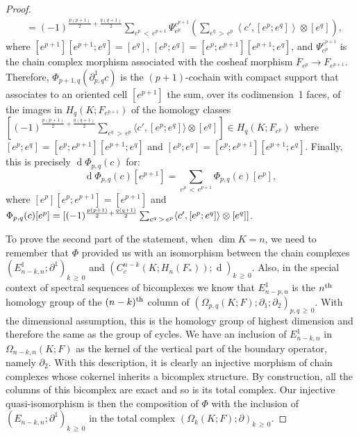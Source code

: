 \documentclass[AHL,Unicode,longabstracts,published]{cedram}
\DeclareMathOperator{\df}{d}
\begin{document}
\begin{proof}
\begin{equation*}
\begin{split}
& = (-1)^{\frac{p(p+1)}{2}+\frac{q(q+1)}{2}}\sum_{e^p\,<\,e^{p+1}} \Psi_{e^p}^{e^{p+1}} \left(\sum_{e^q\,>\,e^{p}} \left\langle c',[e^{p};e^q]\right\rangle \otimes[e^q]\right),
\end{split}
\end{equation*}
where $[e^{p+1}][e^{p+1};e^q]=[e^q]$, $[e^{p};e^q]=[e^p;e^{p+1}][e^{p+1};e^q]$, and $\Psi_{e^p}^{e^{p+1}}$ is the chain complex morphism associated with the cosheaf morphism $F_{e^p}\rightarrow F_{e^{p+1}}$. Therefore, $\Phi_{p+1,q}(\partial^1_{p,q} c)$ is the $(p+1)$-cochain with compact support that associates to an oriented cell $[e^{p+1}]$ the sum, over its codimension~1 faces, of the images in $H_q(K;F_{e^{p+1}})$ of the homology classes $[(-1)^{\frac{p(p+1)}{2}+\frac{q(q+1)}{2}} \sum_{e^q\,>\,e^{p}} \langle c',[e^{p};e^q]\rangle \otimes[e^q]]\in H_q(K;F_{e^{p}})$ where $[e^{p};e^q]=[e^p;e^{p+1}][e^{p+1};e^q]$ and $[e^{p};e^q]=[e^p;e^{p+1}][e^{p+1};e^q]$. Finally, this is precisely $\df\Phi_{p,q}(c)$ for:
\begin{equation*}
\df\Phi_{p,q}(c)[e^{p+1}]=\sum_{e^p\,<\,e^{p+1}}\Phi_{p,q}(c)[e^p],
\end{equation*}
where $[e^{p}][e^{p};e^{p+1}]=[e^{p+1}]$ and $\Phi_{p,q}(c)[e^p]=[(-1)^{\frac{p(p+1)}{2}+\frac{q(q+1)}{2}} \sum_{e^q\,>\,e^{p}} \langle c',[e^{p};e^q]\rangle\linebreak \otimes[e^q]]$.


To prove the second part of the statement, when $\dim K=n$, we need to remember that $\Phi$ provided us with an isomorphism between the chain complexes $(E^1_{n-k,n};\partial^1)_{k\,\geq\,0}$ and $(C^{n-k}_c(K;H_n(F_*));\df)_{k\,\geq\,0}$. Also, in the special context of spectral sequences of bicomplexes we know that $E^1_{n-p,n}$ is the $n^{\rm th}$ homology group of the $(n-k)^{\rm th}$ column of $(\Omega_{p,q}(K;F);\partial_1;\partial_2)_{p,q\,\geq\,0}$. With the dimensional assumption, this is the homology group of highest dimension and therefore the same as the group of cycles. We have an inclusion of $E^1_{n-k,n}$ in $\Omega_{n-k,n}(K;F)$ as the kernel of the vertical part of the boundary operator, namely $\partial_2$. With this description, it is clearly an injective morphism of chain complexes whose cokernel inherits a bicomplex structure. By construction, all the columns of this bicomplex are exact and so is its total complex. Our injective quasi-isomorphism is then the composition of $\Phi$ with the inclusion of $(E_{n-k,n};\partial^1)_{k\,\geq\,0}$ in the total complex $(\Omega_k(K;F);\partial)_{k\,\geq\,0}$.
\end{proof}
\end{document}
